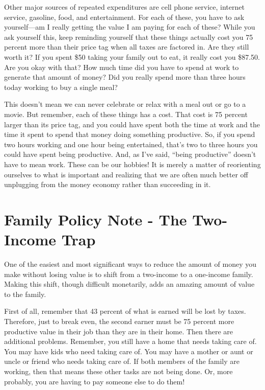 Other major sources of repeated expenditures are cell phone service,
internet service, gasoline, food, and entertainment. For each of these,
you have to ask yourself—am I really getting the value I am paying for
each of these? While you ask yourself this, keep reminding yourself
that these things actually cost you 75 percent more than their price
tag when all taxes are factored in. Are they still worth it? If you
spent \$50 taking your family out to eat, it really cost you \$87.50.
Are you okay with that? How much time did you have to spend at work to
generate that amount of money? Did you really spend more than three
hours today working to buy a single meal?

This doesn’t mean we can never celebrate or relax with a meal out or go
to a movie. But remember, each of these things has a cost. That cost is
75 percent larger than its price tag, and you could have spent both the
time at work and the time it spent to spend that money doing something
productive. So, if you spend two hours working and one hour being
entertained, that’s two to three hours you could have spent being
productive. And, as I’ve said, “being productive” doesn’t have to mean
work. These can be our hobbies!  It is merely a matter of reorienting
ourselves to what is important and realizing that we are often much
better off unplugging from the money economy rather than succeeding in
it.

\section{Family Policy Note - The Two-Income Trap}

One of the easiest and most significant ways to reduce the amount of
money you make without losing value is to shift from a two-income to a
one-income family. Making this shift, though difficult monetarily, adds
an amazing amount of value to the family.

First of all, remember that 43 percent of what is earned will be lost by
taxes. Therefore, just to break even, the second earner must be 75
percent more productive value in their job than they are in their home.
Then there are
additional problems. Remember, you still have a home that needs taking
care of. You may have kids who need taking care of. You may have a
mother or aunt or uncle or friend who needs taking care of. If both
members of the family are working, then that means these other tasks
are not being done. Or, more probably, you are having to pay someone
else to do them!

